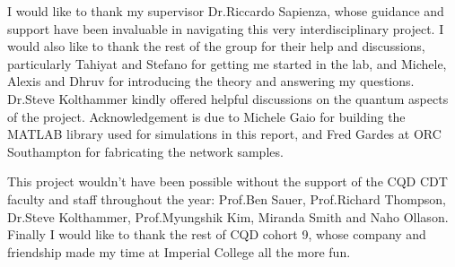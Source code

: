 \clearpage
{}

\begin{acknowledgements}

I would like to thank my supervisor Dr.Riccardo Sapienza, whose guidance and support have been invaluable in navigating this very interdisciplinary project. I would also like to thank the rest of the group for their help and discussions, particularly Tahiyat and Stefano for getting me started in the lab, and Michele, Alexis and Dhruv for introducing the theory and answering my questions. Dr.Steve Kolthammer kindly offered helpful discussions on the quantum aspects of the project. Acknowledgement is due to Michele Gaio for building the MATLAB library used for simulations in this report, and Fred Gardes at ORC Southampton for fabricating the network samples.

This project wouldn't have been possible without the support of the CQD CDT faculty and staff throughout the year: Prof.Ben Sauer, Prof.Richard Thompson, Dr.Steve Kolthammer, Prof.Myungshik Kim, Miranda Smith and Naho Ollason. Finally I would like to thank the rest of CQD cohort 9, whose company and friendship made my time at Imperial College all the more fun.



\end{acknowledgements}